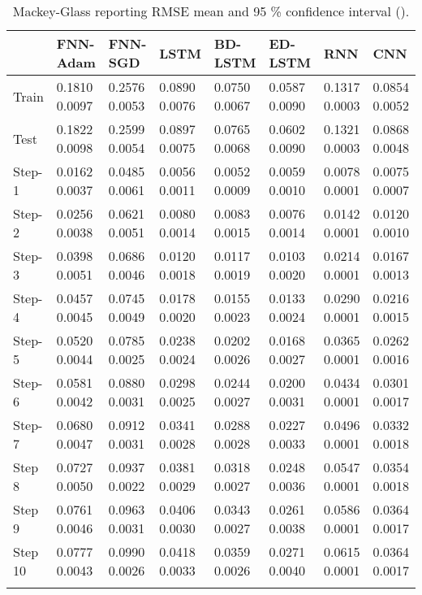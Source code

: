 \documentclass[final,5p,times,twocolumn]{elsarticle}
\begin{document}
\begin{table*}[htbp]
 \small 
\begin{tabular}{llllllll}
\hline
 &  FNN-Adam& FNN-SGD & LSTM & BD-LSTM  & ED-LSTM & RNN & CNN\\
				
\hline
\hline
Train &      
0.1810	0.0097&
0.2576	0.0053&
0.0890	0.0076&
0.0750	0.0067&
0.0587	0.0090&
0.1317	0.0003& 0.0854		0.0052\\
Test &      
0.1822	0.0098&
0.2599	0.0054&
0.0897	0.0075&
0.0765	0.0068&
0.0602	0.0090&
0.1321	0.0003&0.0868		0.0048\\
Step-1 &      
0.0162	0.0037&
0.0485	0.0061&
0.0056	0.0011&
0.0052	0.0009&
0.0059	0.0010&
0.0078	0.0001&	0.0075		0.0007\\
Step-2 &      
0.0256	0.0038&
0.0621	0.0051&
0.0080	0.0014&
0.0083	0.0015&
0.0076	0.0014&
0.0142	0.0001&0.0120		0.0010\\
Step-3 &      
0.0398	0.0051&
0.0686	0.0046&
0.0120	0.0018&
0.0117	0.0019&
0.0103	0.0020&
0.0214	0.0001&	0.0167		0.0013\\
Step-4 &      
0.0457	0.0045&
0.0745	0.0049&
0.0178	0.0020&
0.0155	0.0023&
0.0133	0.0024&
0.0290	0.0001&0.0216		0.0015\\
Step-5 &      
0.0520	0.0044&
0.0785	0.0025&
0.0238	0.0024&
0.0202	0.0026&
0.0168	0.0027&
0.0365	0.0001&	0.0262		0.0016\\
Step-6 &      
0.0581	0.0042&
0.0880	0.0031&
0.0298	0.0025&
0.0244	0.0027&
0.0200	0.0031&
0.0434	0.0001&0.0301		0.0017\\
Step-7 &      
0.0680	0.0047&
0.0912	0.0031&
0.0341	0.0028&
0.0288	0.0028&
0.0227	0.0033&
0.0496	0.0001&	0.0332		0.0018\\
Step 8 &      
0.0727	0.0050&
0.0937	0.0022&
0.0381	0.0029&
0.0318	0.0027&
0.0248	0.0036&
0.0547	0.0001&	0.0354		0.0018\\
Step 9 &      
0.0761	0.0046&
0.0963	0.0031&
0.0406	0.0030&
0.0343	0.0027&
0.0261	0.0038&
0.0586	0.0001&	0.0364		0.0017\\
Step 10 &      
0.0777	0.0043&
0.0990	0.0026&
0.0418	0.0033&
0.0359	0.0026&
0.0271	0.0040&
0.0615	0.0001&	0.0364		0.0017\\
\hline
 &
\end{tabular}
\caption{Mackey-Glass reporting RMSE mean and 95 \% confidence interval   ().}
\label{tab:mackey}
\end{table*}
\end{document}
